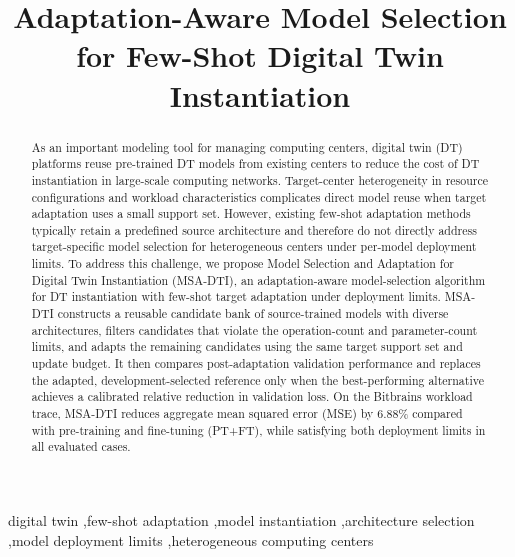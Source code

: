 \documentclass[a4paper,fleqn]{cas-sc}
\begin{document}
\setlength{\abovedisplayskip}{0pt plus 1pt minus 0pt}
\setlength{\belowdisplayskip}{5pt plus 1pt minus 1pt}
\setlength{\abovedisplayshortskip}{0pt plus 1pt minus 0pt}
\setlength{\belowdisplayshortskip}{5pt plus 1pt minus 1pt}


\title[mode=title]{Adaptation-Aware Model Selection for Few-Shot Digital Twin Instantiation}

\begin{abstract}
As an important modeling tool for managing computing centers, digital twin
(DT) platforms reuse pre-trained DT models from existing centers to reduce the
cost of DT instantiation in large-scale computing networks. Target-center
heterogeneity in resource configurations and workload characteristics
complicates direct model reuse when target adaptation uses a small support set.
However, existing few-shot adaptation methods typically retain a predefined
source architecture and therefore do not directly address target-specific
model selection for heterogeneous centers under per-model deployment limits.
To address this challenge, we propose Model Selection and Adaptation for
Digital Twin Instantiation (MSA-DTI), an adaptation-aware model-selection
algorithm for DT instantiation with few-shot target adaptation under deployment
limits. MSA-DTI constructs a reusable candidate bank of source-trained models
with diverse architectures, filters candidates that violate the operation-count
and parameter-count limits, and adapts the remaining candidates using the same
target support set and update budget. It then compares post-adaptation
validation performance and replaces the adapted, development-selected reference only when the
best-performing alternative achieves a calibrated relative reduction in
validation loss. On the Bitbrains workload trace, MSA-DTI reduces aggregate mean squared error
(MSE) by 6.88\% compared with pre-training and fine-tuning (PT+FT), while
satisfying both deployment limits in all evaluated cases.
\end{abstract}

\begin{keywords}
digital twin
\sep few-shot adaptation
\sep model instantiation
\sep architecture selection
\sep model deployment limits
\sep heterogeneous computing centers
\end{keywords}

\maketitle
\end{document}
